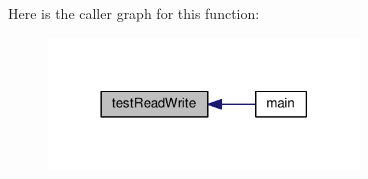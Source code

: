 Here is the caller graph for this function\-:
\nopagebreak
\begin{figure}[H]
\begin{center}
\leavevmode
\includegraphics[width=234pt]{data-pool-block-manager-test_8c_a75323f97b259a6284370855087fb48ff_icgraph}
\end{center}
\end{figure}


